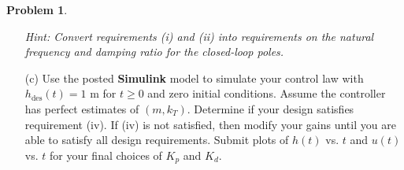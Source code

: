 \documentclass{article}
\theoremstyle{definition}
\newtheorem{problem}{Problem}
\begin{document}
\begin{problem}
\begin{enumerate}
    \textit{Hint: Convert requirements (i) and (ii) into requirements on the natural frequency and damping ratio for the closed-loop poles.}
    
    \item[(c)] Use the posted \textbf{Simulink} model to simulate your control law with \( h_{\text{des}}(t) = 1 \) m for \( t \geq 0 \) and zero initial conditions. Assume the controller has perfect estimates of \( (m, k_T) \). Determine if your design satisfies requirement (iv). If (iv) is not satisfied, then modify your gains until you are able to satisfy all design requirements. Submit plots of \( h(t) \) vs. \( t \) and \( u(t) \) vs. \( t \) for your final choices of \( K_p \) and \( K_d \).
    
\end{enumerate}




\end{problem}
\end{document}
